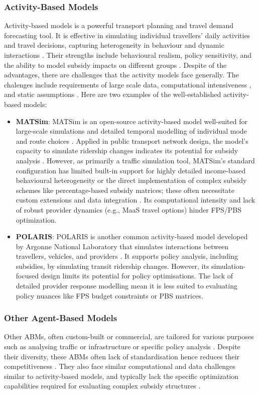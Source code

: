 \documentclass[a4paper,fleqn]{cas-sc}
\begin{document}
\subsubsection{Activity-Based Models}
Activity-based models is a powerful transport planning and travel demand forecasting tool. It is effective in simulating individual travellers' daily activities and travel decisions, capturing heterogeneity in behaviour and dynamic interactions \citep{McNally2007b}. Their strengths include behavioural realism, policy sensitivity, and the ability to model subsidy impacts on different groups \citep{McNally2007b}. Despite of the advantages, there are challenges that the activity models face generally. The chalenges include requirements of large scale data, computational intensiveness , and static assumptions \citep{Freedman2025}.  Here are two examples of the well-established activity-based models:

\begin{itemize}
    \item \textbf{MATSim}: MATSim is an open-source activity-based model well-suited for large-scale simulations and detailed temporal modelling of individual mode and route choices \citep{Horni2016}. Applied in public transport network design, the model's capacity to simulate ridership changes indicates its potential for subsidy analysis \citep{Horni2016}. However, as primarily a traffic simulation tool, MATSim's standard configuration has limited built-in support for highly detailed income-based behavioural heterogeneity or the direct implementation of complex subsidy schemes like percentage-based subsidy matrices; these often necessitate custom extensions and data integration \citep{Jafari2024}. Its computational intensity and lack of robust provider dynamics (e.g., MaaS travel options) hinder FPS/PBS optimization.
    \item \textbf{POLARIS}: POLARIS is another common activity-based model developed by Argonne National Laboratory that simulates interactions between travellers, vehicles, and providers \citep{Auld2016}. It supports policy analysis, including subsidies, by simulating transit ridership changes. However, its simulation-focused design limits its potential for policy optimisations. The lack of detailed provider response modelling mean it is less suited to evaluating policy nuances like FPS budget constraints or PBS matrices\citep{Wong2020}.
\end{itemize}

\subsubsection{Other Agent-Based Models}
Other ABMs, often custom-built or commercial, are tailored for various purposes such as analysing traffic or infrastructure or specific policy analysis \citep{Bazzan2014}. Despite their diversity, these ABMs often lack of standardisation hence reduces their competitiveness \citep{Kagho2020}. They also face similar computational and data challenges similar to activity-based models, and typically lack the specific optimization capabilities required for evaluating complex subsidy structures \citep{Zhao2016}.
\end{document}
